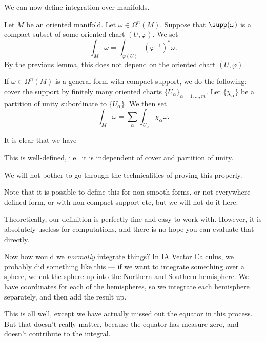 \documentclass[a4paper]{article}
\begin{document}
We can now define integration over manifolds.

\begin{defi}
  Let $M$ be an oriented manifold. Let $\omega \in \Omega^n(M)$. Suppose that $\supp(\omega)$ is a compact subset of some oriented chart $(U, \varphi)$. We set
  \[
    \int_M \omega = \int_{\varphi(U)} (\varphi^{-1})^* \omega.
  \]
  By the previous lemma, this does not depend on the oriented chart $(U, \varphi)$.

  If $\omega \in \Omega^n(M)$ is a general form with compact support, we do the following: cover the support by finitely many oriented charts $\{U_\alpha\}_{\alpha = 1, \ldots, m}$. Let $\{\chi_\alpha\}$ be a partition of unity subordinate to $\{U_\alpha\}$. We then set
  \[
    \int_M \omega = \sum_\alpha \int_{U_\alpha} \chi_\alpha \omega.
  \]
\end{defi}

It is clear that we have
\begin{lemma}
  This is well-defined, i.e.\ it is independent of cover and partition of unity.
\end{lemma}
We will not bother to go through the technicalities of proving this properly.

Note that it is possible to define this for non-smooth forms, or not-everywhere-defined form, or with non-compact support etc, but we will not do it here.

Theoretically, our definition is perfectly fine and easy to work with. However, it is absolutely useless for computations, and there is no hope you can evaluate that directly.

Now how would we \emph{normally} integrate things? In IA Vector Calculus, we probably did something like this --- if we want to integrate something over a sphere, we cut the sphere up into the Northern and Southern hemisphere. We have coordinates for each of the hemispheres, so we integrate each hemisphere separately, and then add the result up.

This is all well, except we have actually missed out the equator in this process. But that doesn't really matter, because the equator has measure zero, and doesn't contribute to the integral.
\end{document}
